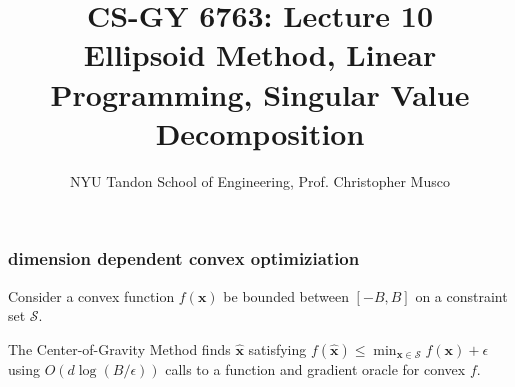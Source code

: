 \documentclass[compress]{beamer}
\title{CS-GY 6763: Lecture 10 \\ Ellipsoid Method, Linear Programming, Singular Value Decomposition}
\author{NYU Tandon School of Engineering, Prof. Christopher Musco}
\date{}
\newcommand{\bv}[1]{\mathbf{#1}}
\begin{document}
\begin{frame}
	\titlepage 
\end{frame}


\begin{frame}[t]
	\frametitle{dimension dependent convex optimiziation}	
	Consider a convex function $f(\bv{x})$ be bounded between $[-B, B]$ on a constraint set $\mathcal{S}$. 
	\begin{theorem}
		The Center-of-Gravity Method finds $\hat{\bv{x}}$ satisfying $f(\hat{\bv{x}}) \leq \min_{\bv{x}\in \mathcal{S}}f(\bv{x})+\epsilon$  using $O(d\log(B/\epsilon))$ calls to a function and gradient oracle for convex $f$.
	\end{theorem}
\end{frame}
\end{document}
